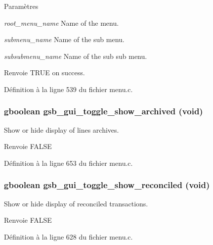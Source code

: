 \begin{DoxyParams}{Paramètres}
\item[{\em root\_\-menu\_\-name}]Name of the menu. \item[{\em submenu\_\-name}]Name of the sub menu. \item[{\em subsubmenu\_\-name}]Name of the sub sub menu.\end{DoxyParams}
\begin{DoxyReturn}{Renvoie}
TRUE on success. 
\end{DoxyReturn}


Définition à la ligne 539 du fichier menu.c.

\subsubsection[{gsb\_\-gui\_\-toggle\_\-show\_\-archived}]{\setlength{\rightskip}{0pt plus 5cm}gboolean gsb\_\-gui\_\-toggle\_\-show\_\-archived (void)}\label{menu_8h_aa2af14ac64481c25621aef9c3e43eea5}
Show or hide display of lines archives.

\begin{DoxyReturn}{Renvoie}
FALSE 
\end{DoxyReturn}


Définition à la ligne 653 du fichier menu.c.

\subsubsection[{gsb\_\-gui\_\-toggle\_\-show\_\-reconciled}]{\setlength{\rightskip}{0pt plus 5cm}gboolean gsb\_\-gui\_\-toggle\_\-show\_\-reconciled (void)}\label{menu_8h_aeb017cf19bed8e724d46231072994de9}
Show or hide display of reconciled transactions.

\begin{DoxyReturn}{Renvoie}
FALSE 
\end{DoxyReturn}


Définition à la ligne 628 du fichier menu.c.

